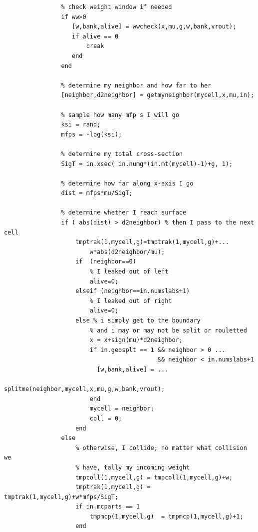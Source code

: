 \documentclass[letter,11pt]{article}
\begin{document}
{\begin{verbatim}
                % check weight window if needed
                if ww>0
                   [w,bank,alive] = wwcheck(x,mu,g,w,bank,vrout);
                   if alive == 0
                       break
                   end
                end   
                
                % determine my neighbor and how far to her
                [neighbor,d2neighbor] = getmyneighbor(mycell,x,mu,in);
                
                % sample how many mfp's I will go
                ksi = rand;
                mfps = -log(ksi);
                
                % determine my total cross-section
                SigT = in.xsec( in.numg*(in.mt(mycell)-1)+g, 1);
                
                % determine how far along x-axis I go
                dist = mfps*mu/SigT;
                
                % determine whether I reach surface
                if ( abs(dist) > d2neighbor) % then I pass to the next cell
                    tmptrak(1,mycell,g)=tmptrak(1,mycell,g)+...
                        w*abs(d2neighbor/mu);
                    if  (neighbor==0)
                        % I leaked out of left
                        alive=0;
                    elseif (neighbor==in.numslabs+1)
                        % I leaked out of right
                        alive=0;
                    else % i simply get to the boundary
                        % and i may or may not be split or rouletted
                        x = x+sign(mu)*d2neighbor;
                        if in.geosplt == 1 && neighbor > 0 ...
                                           && neighbor < in.numslabs+1     
                          [w,bank,alive] = ...
                              splitme(neighbor,mycell,x,mu,g,w,bank,vrout);
                        end
                        mycell = neighbor;
                        coll = 0;
                    end
                else
                    % otherwise, I collide; no matter what collision we
                    % have, tally my incoming weight
                    tmpcoll(1,mycell,g) = tmpcoll(1,mycell,g)+w;
                    tmptrak(1,mycell,g) = tmptrak(1,mycell,g)+w*mfps/SigT;
                    if in.mcparts == 1
                    	tmpmcp(1,mycell,g)  = tmpmcp(1,mycell,g)+1; 
                    end
                    

\end{verbatim}}
\end{document}

